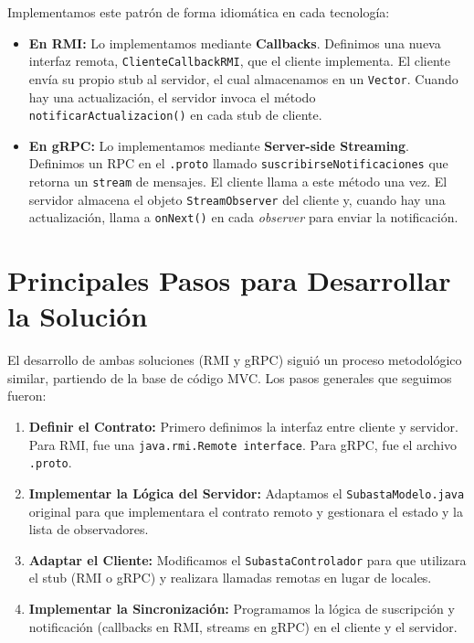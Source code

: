 \documentclass[11pt, a4paper]{article}
\begin{document}
Implementamos este patrón de forma idiomática en cada tecnología:
\begin{itemize}
    \item \textbf{En RMI:} Lo implementamos mediante \textbf{Callbacks}.
Definimos una nueva interfaz remota, \texttt{ClienteCallbackRMI}, que el cliente implementa.
El cliente envía su propio stub al servidor, el cual almacenamos en un \texttt{Vector}.
Cuando hay una actualización, el servidor invoca el método \texttt{notificarActualizacion()} en cada stub de cliente.
\item \textbf{En gRPC:} Lo implementamos mediante \textbf{Server-side Streaming}.
Definimos un RPC en el \texttt{.proto} llamado \texttt{suscribirseNotificaciones} que retorna un \texttt{stream} de mensajes.
El cliente llama a este método una vez. El servidor almacena el objeto \texttt{StreamObserver} del cliente y, cuando hay una actualización, llama a \texttt{onNext()} en cada \textit{observer} para enviar la notificación.
\end{itemize}

\section{Principales Pasos para Desarrollar la Solución}
\label{sec:pasos}

El desarrollo de ambas soluciones (RMI y gRPC) siguió un proceso metodológico similar, partiendo de la base de código MVC. Los pasos generales que seguimos fueron:

\begin{enumerate}
    \item \textbf{Definir el Contrato:} Primero definimos la interfaz entre cliente y servidor. Para RMI, fue una \texttt{java.rmi.Remote interface}. Para gRPC, fue el archivo \texttt{.proto}.
    \item \textbf{Implementar la Lógica del Servidor:} Adaptamos el \texttt{SubastaModelo.java} original para que implementara el contrato remoto y gestionara el estado y la lista de observadores.
    \item \textbf{Adaptar el Cliente:} Modificamos el \texttt{SubastaControlador} para que utilizara el stub (RMI o gRPC) y realizara llamadas remotas en lugar de locales.
    \item \textbf{Implementar la Sincronización:} Programamos la lógica de suscripción y notificación (callbacks en RMI, streams en gRPC) en el cliente y el servidor.
\end{enumerate}
\end{document}
